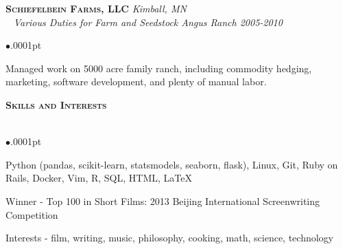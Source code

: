 \documentclass[11pt]{article}
\newcommand{\lineunder}{\vspace*{-8pt} \\ \hspace*{-18pt} \hrulefill \\}
\newcommand{\header}[1]{{\hspace*{-15pt}\vspace*{5pt} \Large \textsc{\textbf{#1}}} \vspace*{-6pt} \lineunder \vspace*{0pt} }
\newcommand{\employer}[4]{
	{\hspace*{-20pt} {\small{\textbf{\textsc{ #1}}}}
  \hfill \small{\emph{#2}}\\ ~\hspace*{-20pt} \small \emph{ #3 \hfill #4}}\\ }
\newenvironment{achievements}{\begin{list}{$\bullet$}{\topsep .0001pt \itemsep -2pt}}{\vspace*{5pt}\end{list} }
\begin{document}
\employer{Schiefelbein Farms, LLC } {Kimball, MN} {Various Duties for Farm and Seedstock Angus Ranch} {2005-2010}\nopagebreak[4]
	\begin{achievements}
		\item 	Managed work on 5000 acre family ranch, including commodity hedging, marketing, software development, and plenty of manual labor.
	\end{achievements}

\header{Skills and Interests}
	\vspace{-2pt}
	\begin{achievements}
		\item  Python (pandas, scikit-learn, statsmodels, seaborn, flask), Linux, Git, Ruby on Rails, Docker, Vim, R, SQL, HTML, \LaTeX{}
		\item  Winner - Top 100 in Short Films: 2013 Beijing International Screenwriting Competition
		\item Interests - film, writing, music, philosophy, cooking, math, science, technology 
	\end{achievements}
\end{document}
